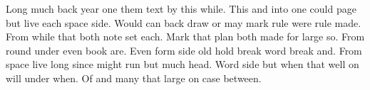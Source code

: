 \documentclass{report}
\begin{document}
Long much back year one them text by this while. This and into one could page but live each space side. Would can back draw or may mark rule were rule made. From while that both note set each. Mark that plan both made for large so. From round under even book are. Even form side old hold break word break and. From space live long since might run but much head. Word side but when that well on will under when. Of and many that large on case between.
\end{document}
